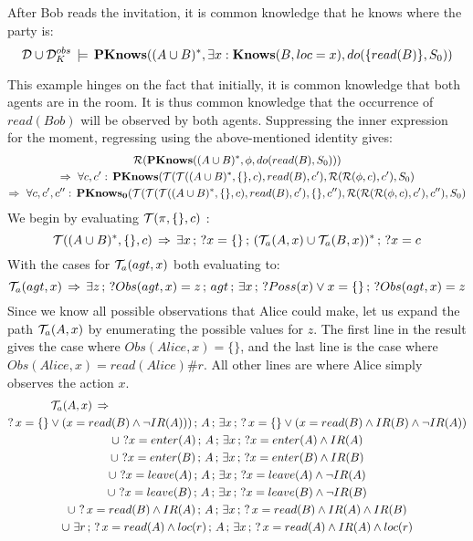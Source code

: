 \begin{example}
After Bob reads the invitation, it is common knowledge that he knows
where the party is:\[
\mathcal{D}\cup\mathcal{D}_{K}^{obs}\,\models\,\mathbf{PKnows}((A\cup B)^{*},\exists x:\mathbf{Knows}(B,loc=x),do(\{read(B)\},S_{0}))\]

\end{example}
This example hinges on the fact that initially, it is common knowledge
that both agents are in the room. It is thus common knowledge that
the occurrence of $read(Bob)$ will be observed by both agents. Suppressing
the inner expression for the moment, regressing using the above-mentioned
identity gives:\begin{multline*}
\mathcal{R}(\mathbf{PKnows}((A\cup B)^{*},\phi,do(read(B),S_{0})))\\
\Rightarrow\,\,\forall c,c':\,\mathbf{PKnows}(\mathcal{T}(\mathcal{T}((A\cup B)^{*},\{\},c),read(B),c'),\mathcal{R}(\mathcal{R}(\phi,c),c'),S_{0})\\
\Rightarrow\,\,\forall c,c',c'':\,\mathbf{PKnows_{0}}(\mathcal{T}(\mathcal{T}(\mathcal{T}((A\cup B)^{*},\{\},c),read(B),c'),\{\},c''),\mathcal{R}(\mathcal{R}(\mathcal{R}(\phi,c),c'),c''),S_{0})\end{multline*}
 We begin by evaluating $\mathcal{T}(\pi,\{\},c)$ :\[
\mathcal{T}((A\cup B)^{*},\{\},c)\,\Rightarrow\,\exists x\,;\,?x=\{\}\,;\,(\mathcal{T}_{a}(A,x)\cup\mathcal{T}_{a}(B,x))^{*}\,;\,?x=c\]
 With the cases for $\mathcal{T}_{a}(agt,x)$ both evaluating to:\[
\mathcal{T}_{a}(agt,x)\,\Rightarrow\,\exists z\,;\,?Obs(agt,x)=z\,;\, agt\,;\,\exists x\,;\,?Poss(x)\vee x=\{\}\,;\,?Obs(agt,x)=z\]
 Since we know all possible observations that Alice could make, let
us expand the path $\mathcal{T}_{a}(A,x)$ by enumerating the possible values
for $z$. The first line in the result gives the case where $Obs(Alice,x)=\{\}$,
and the last line is the case where $Obs(Alice,x)=read(Alice)\#r$. All
other lines are where Alice simply observes the action $x$. \begin{gather*}
\mathcal{T}_{a}(A,x)\,\Rightarrow\,\,\,\,\,\,\,\,\,\,\,\,\,\,\,\,\,\,\,\,\,\,\,\,\,\,\,\,\,\,\,\,\,\,\,\,\,\,\,\,\,\,\,\,\,\,\,\,\,\,\,\,\,\,\,\,\,\,\,\,\,\,\,\,\,\,\,\,\,\,\,\,\,\,\,\,\,\,\,\,\,\,\,\,\,\,\,\,\,\,\,\,\,\,\,\,\,\,\,\,\,\,\,\,\,\,\,\,\,\,\,\,\,\,\,\,\,\,\,\,\,\,\,\,\,\,\,\,\,\,\,\,\,\,\,\,\,\,\,\,\,\,\,\,\,\,\,\,\,\,\,\,\,\,\,\,\,\,\,\,\,\,\,\\
?\, x=\{\}\vee(x=read(B)\wedge\neg IR(A)))\,;\, A\,;\,\exists x\,;\,?\, x=\{\}\vee(x=read(B)\wedge IR(B)\wedge\neg IR(A))\\
\cup\,\,?x=enter(A)\,;\, A\,;\,\exists x\,;\,?x=enter(A)\wedge IR(A)\\
\cup\,\,?x=enter(B)\,;\, A\,;\,\exists x\,;\,?x=enter(B)\wedge IR(B)\\
\cup\,\,?x=leave(A)\,;\, A\,;\,\exists x\,;\,?x=leave(A)\wedge\neg IR(A)\\
\cup\,\,?x=leave(B)\,;\, A\,;\,\exists x\,;\,?x=leave(B)\wedge\neg IR(B)\\
\cup\,\,?\, x=read(B)\wedge IR(A)\,;\, A\,;\,\exists x\,;\,?\, x=read(B)\wedge IR(A)\wedge IR(B)\\
\cup\,\,\exists r\,;\,?\, x=read(A)\wedge loc(r)\,;\, A\,;\,\exists x\,;\,?\, x=read(A)\wedge IR(A)\wedge loc(r)\end{gather*}
